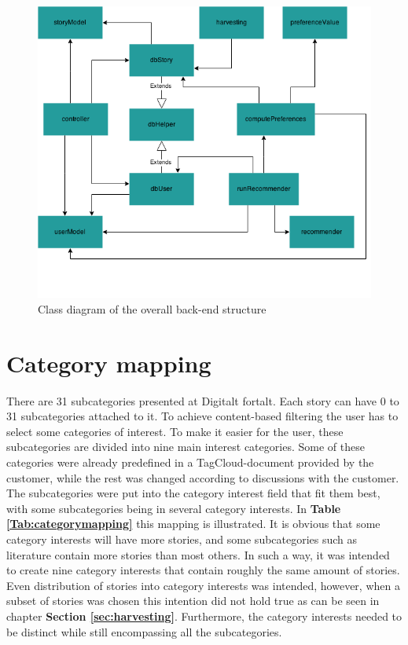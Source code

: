 \begin{figure}[h!]
	\centering
	\includegraphics[width=\textwidth]{fig/overall_backend}
	\caption{Class diagram of the overall back-end structure}
	\label{Fig:overall_backend}
\end{figure}

\section{Category mapping} 
\label{sec:categorymapping}

There are 31 subcategories presented at Digitalt fortalt. Each story can have 0 to 31 subcategories attached to it. To achieve content-based filtering the user has to select some categories of interest. To make it easier for the user, these subcategories are divided into nine main interest categories. Some of these categories were already predefined in a TagCloud-document provided by the customer, while the rest was changed according to discussions with the customer. The subcategories were put into the category interest field that fit them best, with some subcategories being in several category interests. In \textbf{Table \ref{Tab:categorymapping}} this mapping is illustrated. It is obvious that some category interests will have more stories, and some subcategories such as literature contain more stories than most others. In such a way, it was intended to create nine category interests that contain roughly the same amount of stories. Even distribution of stories into category interests was intended, however, when a subset of stories was chosen this intention did not hold true as can be seen in chapter \textbf{Section \ref{sec:harvesting}}. Furthermore, the category interests needed to be distinct while still encompassing all the subcategories. 

